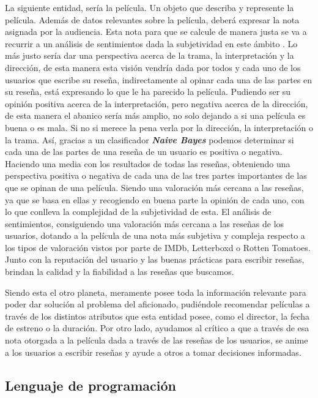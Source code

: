 La siguiente entidad, sería la película. Un objeto que describa y represente la película. Además de 
datos relevantes sobre la película, deberá expresar la nota asignada por la audiencia. Esta nota para 
que se calcule de manera justa se va a recurrir a un análisis de sentimientos dada la subjetividad en 
este ámbito \cite{SubjTV}. Lo más justo sería dar una perspectiva acerca de la trama, la interpretación 
y la dirección, de esta manera esta visión vendría dada por todos y cada uno de los usuarios que 
escribe su reseña, indirectamente al opinar cada una de las partes en su reseña, está expresando lo que 
le ha parecido la película. Pudiendo ser su opinión positiva acerca de la interpretación, pero negativa 
acerca de la dirección, de esta manera el abanico sería más amplio, no solo dejando a si una película 
es buena o es mala. Si no si merece la pena verla por la dirección, la interpretación o la trama. Así, 
gracias a un clasificador \textbf{\textit{Naive Bayes}} \cite{TwNavieB} podemos determinar si cada una 
de las partes de una reseña de un usuario es positiva o negativa. Haciendo una media con los resultados 
de todas las reseñas, obteniendo una perspectiva positiva o negativa de cada una de las tres partes 
importantes de las que se opinan de una película. Siendo una valoración más cercana a las reseñas, ya 
que se basa en ellas y recogiendo en buena parte la opinión de cada uno, con lo que conlleva la 
complejidad de la subjetividad de esta.
El análisis de sentimientos, consiguiendo una valoración más cercana a las reseñas de los usuarios, 
dotando a la película de una nota más subjetiva y compleja respecto a los tipos de valoración vistos 
por parte de IMDb, Letterboxd o Rotten Tomatoes. Junto con la reputación del usuario y las buenas 
prácticas para escribir reseñas, brindan la calidad y la fiabilidad a las reseñas que buscamos.

Siendo esta el otro planeta, meramente posee toda la información relevante para poder dar solución al 
problema del aficionado, pudiéndole recomendar películas a través de los distintos atributos que esta 
entidad posee, como el director, la fecha de estreno o la duración. Por otro lado, ayudamos al crítico 
a que a través de esa nota otorgada a la película dada a través de las reseñas de los usuarios, se 
anime a los usuarios a escribir reseñas y ayude a otros a tomar decisiones informadas.

\subsection{Lenguaje de programación}

